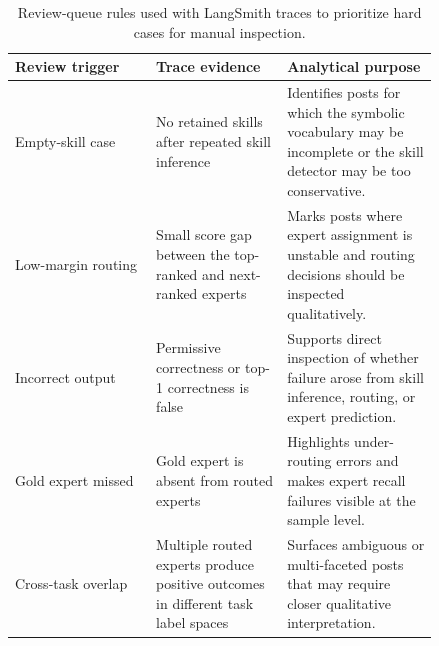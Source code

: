 \begin{table}[t]
\centering
\small
\begin{tabular}{p{0.28\linewidth} p{0.26\linewidth} p{0.30\linewidth}}
\hline
Review trigger & Trace evidence & Analytical purpose \\
\hline
Empty-skill case &
No retained skills after repeated skill inference &
Identifies posts for which the symbolic vocabulary may be incomplete or the skill detector may be too conservative. \\
Low-margin routing &
Small score gap between the top-ranked and next-ranked experts &
Marks posts where expert assignment is unstable and routing decisions should be inspected qualitatively. \\
Incorrect output &
Permissive correctness or top-1 correctness is false &
Supports direct inspection of whether failure arose from skill inference, routing, or expert prediction. \\
Gold expert missed &
Gold expert is absent from routed experts &
Highlights under-routing errors and makes expert recall failures visible at the sample level. \\
Cross-task overlap &
Multiple routed experts produce positive outcomes in different task label spaces &
Surfaces ambiguous or multi-faceted posts that may require closer qualitative interpretation. \\
\hline
\end{tabular}
\caption{Review-queue rules used with LangSmith traces to prioritize hard cases for manual inspection.}
\label{tab:langsmith_review_rules}
\end{table}
